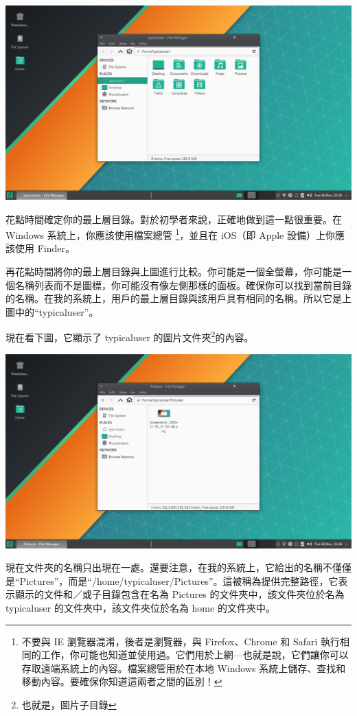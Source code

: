 \documentclass[]{article}
\begin{document}
\includegraphics[scale = 0.25]{linuxthunar1.png} \hspace{1em}

花點時間確定你的最上層目錄。對於初學者來說，正確地做到這一點很重要。在 Windows 系統上，你應該使用檔案總管 \footnote{不要與 IE 瀏覽器混淆，後者是瀏覽器，與 Firefox、Chrome 和 Safari 執行相同的工作，你可能也知道並使用過。它們用於上網---也就是說，它們讓你可以存取遠端系統上的內容。檔案總管用於在本地 Windows 系統上儲存、查找和移動內容。要確保你知道這兩者之間的區別！}，並且在 iOS（即 Apple 設備）上你應該使用 Finder。

再花點時間將你的最上層目錄與上圖進行比較。你可能是一個全螢幕，你可能是一個名稱列表而不是圖標，你可能沒有像左側那樣的面板。確保你可以找到當前目錄的名稱。在我的系統上，用戶的最上層目錄與該用戶具有相同的名稱。所以它是上圖中的``typicaluser''。

\newpage 現在看下圖，它顯示了 typicaluser 的圖片文件夾\footnote{也就是，圖片子目錄}的內容。

\includegraphics[scale = 0.25]{linuxthunar2.png}

現在文件夾的名稱只出現在一處。還要注意，在我的系統上，它給出的名稱不僅僅是``Pictures''，而是``/home/typicaluser/Pictures''。這被稱為提供完整路徑，它表示顯示的文件和／或子目錄包含在名為 Pictures 的文件夾中，該文件夾位於名為 typicaluser 的文件夾中，該文件夾位於名為 home 的文件夾中。
\end{document}
